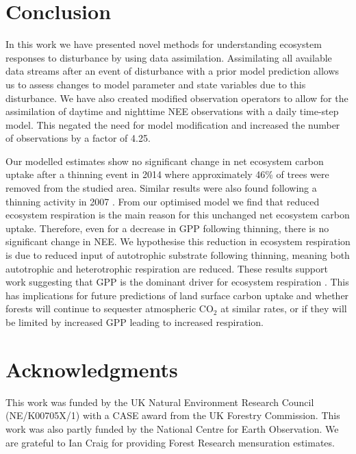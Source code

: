 
\section{Conclusion}

In this work we have presented novel methods for understanding ecosystem responses to disturbance by using data assimilation. Assimilating all available data streams after an event of disturbance with a prior model prediction allows us to assess changes to model parameter and state variables due to this disturbance. We have also created modified observation operators to allow for the assimilation of daytime and nighttime NEE observations with a daily time-step model. This negated the need for model modification and increased the number of observations by a factor of 4.25.

Our modelled estimates show no significant change in net ecosystem carbon uptake after a thinning event in 2014 where approximately 46\% of trees were removed from the studied area. Similar results were also found following a thinning activity in 2007 \citep{wilkinson2016}. From our optimised model we find that reduced ecosystem respiration is the main reason for this unchanged net ecosystem carbon uptake. Therefore, even for a decrease in GPP following thinning, there is no significant change in NEE. We hypothesise this reduction in ecosystem respiration is due to reduced input of autotrophic substrate following thinning, meaning both autotrophic and heterotrophic respiration are reduced. These results support work suggesting that GPP is the dominant driver for ecosystem respiration  \citep{GCB:GCB412, PCE:PCE1053, hogberg2006towards, heinemeyer2012exploring, ELE:ELE12097}. This has implications for future predictions of land surface carbon uptake and whether forests will continue to sequester atmospheric CO\(_{2}\) at similar rates, or if they will be limited by increased GPP leading to increased respiration. 

\section{Acknowledgments}
This work was funded by the UK Natural Environment Research Council (NE/K00705X/1) with a CASE award from the UK Forestry Commission. This work was also partly funded by the National Centre for Earth Observation. We are grateful to Ian Craig for providing Forest Research mensuration estimates.

